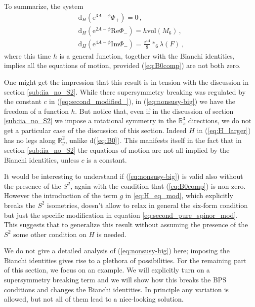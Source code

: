 \documentclass[12pt]{article}
\newcommand{\R}{\mathbb{R}}
\renewcommand{\Re}{\mathrm{Re}}
\renewcommand{\Im}{\mathrm{Im}}
\newcommand{\dd}{\mathrm{d}}
\newcommand{\e}{\mathrm{e}}
\newcommand{\vol}{\mathrm{vol}}
\begin{document}
To summarize, the system 
\begin{subequations}\label{eq:nonsusy-big}
	\begin{align}
	&\dd_H ( \e^{3A-\phi} \Phi_+) = 0 \, ,\\
	&\dd_H( \e^{2A-\phi} \Re\Phi_-) = h \vol(M_6) \, , \\
	&\dd_H ( \e^{4A-\phi}\Im\Phi_-) = \frac{\e^{4A}}{8} *_6 \lambda(F) \, , 
	\end{align}
\end{subequations}
where this time $h$ is a general function, together with the Bianchi identities, implies all the equations of motion, provided (\ref{eq:B0comp}) are not both zero. 

One might get the impression that this result is in tension with the discussion in section \ref{sub:iia_no_S2}. While there supersymmetry breaking was regulated by the constant $c$ in (\ref{eq:second_modified_}), in (\ref{eq:nonsusy-big}) we have the freedom of a function $h$. But notice that, even if in the discussion of section \ref{sub:iia_no_S2} we impose a rotational symmetry in the $\R^3_{x}$ directions, we do not get a particular case of the discussion of this section. Indeed $H$ in  (\ref{eq:H_larger}) has no legs along $\R^2_{y}$, unlike $\dd$(\ref{eq:B0}). This manifests itself in the fact that in section \ref{sub:iia_no_S2} the equations of motion are not all implied by the Bianchi identities, unless $c$ is a constant.  

It would be interesting to understand if (\ref{eq:nonsusy-big}) is valid also without the presence of the $S^2$, again with the condition that (\ref{eq:B0comp}) is non-zero. However the introduction of the term $g$ in \eqref{eq:H_eq_mod}, which explicitly breaks the $S^2$ isometries, doesn't allow to relax in general the six-form condition but just the specific modification in equation \eqref{eq:second_pure_spinor_mod}. This suggests that to generalize this result without assuming the presence of the $S^2$ some other condition on $H$ is needed.

We do not give a detailed analysis of (\ref{eq:nonsusy-big}) here; imposing the Bianchi identities gives rise to a plethora of possibilities. For the remaining part of this section, we focus on an example. We will explicitly turn on a supersymmetry breaking term and we will show how this breaks the BPS conditions and changes the Bianchi identities. In principle any variation is allowed, but not all of them lead to a nice-looking solution. 
\end{document}
